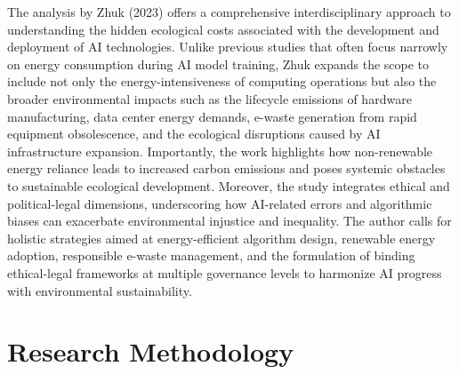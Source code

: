 \documentclass[a4paper, 12pt]{article}
\begin{document}
\hspace{24pt}The analysis by Zhuk (2023) offers a comprehensive interdisciplinary approach to understanding the hidden ecological costs associated with the development and deployment of AI technologies. Unlike previous studies that often focus narrowly on energy consumption during AI model training, Zhuk expands the scope to include not only the energy-intensiveness of computing operations but also the broader environmental impacts such as the lifecycle emissions of hardware manufacturing, data center energy demands, e-waste generation from rapid equipment obsolescence, and the ecological disruptions caused by AI infrastructure expansion. Importantly, the work highlights how non-renewable energy reliance leads to increased carbon emissions and poses systemic obstacles to sustainable ecological development. Moreover, the study integrates ethical and political-legal dimensions, underscoring how AI-related errors and algorithmic biases can exacerbate environmental injustice and inequality. The author calls for holistic strategies aimed at energy-efficient algorithm design, renewable energy adoption, responsible e-waste management, and the formulation of binding ethical-legal frameworks at multiple governance levels to harmonize AI progress with environmental sustainability.
\section{Research Methodology}
\end{document}
